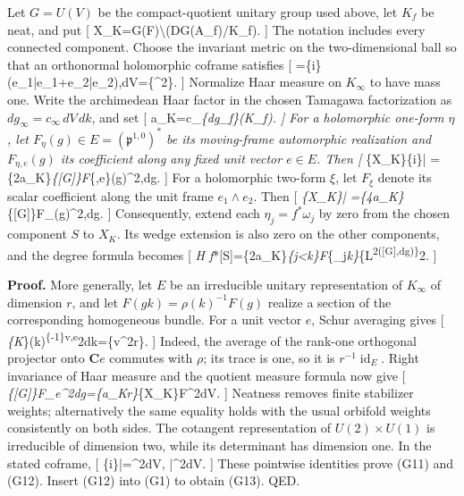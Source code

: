 \documentclass[11pt,a4paper]{article}
\theoremstyle{definition}
\begin{document}
Let \(G=U(V)\) be the compact-quotient unitary group used above, let
\(K_f\) be neat, and put {[}
X\_K=G(F)\backslash(D\times G(\mathbf A\_f)/K\_f). {]} The notation
includes every connected component. Choose the invariant metric on the
two-dimensional ball so that an orthonormal holomorphic coframe
satisfies {[}
\omega=\{i\}(e\_1\wedge\bar e\_1+e\_2\wedge\bar e\_2),\qquad dV=\{\omega\^{}2\}.
{]} Normalize Haar measure on \(K_\infty\) to have mass one. Write the
archimedean Haar factor in the chosen Tamagawa factorization as
\(dg_\infty=c_\infty\,dV\,dk\), and set {[}
a\_K=c\_\infty{}\emph{\{dg\_f\}(K\_f). {]} For a
holomorphic one-form \(\eta\), let
\(F_\eta(g)\in E=(\mathfrak p^{1,0})^*\) be its moving-frame automorphic
realization and \(F_{\eta,e}(g)\) its coefficient along any fixed unit
vector \(e\in E\). Then {[}
\int}\{X\_K\}\{i\}\eta\wedge\bar\eta\wedge\omega
=\{2\over a\_K\}\int\emph{\{{[}G{]}\}\textbar F}\{\eta,e\}(g)\textbar\^{}2,dg.
 {]} For a holomorphic two-form \(\xi\), let \(F_\xi\) denote
its scalar coefficient along the unit frame \(e_1\wedge e_2\). Then {[}
\int\emph{\{X\_K\}\xi\wedge\bar\xi
=\{4\over a\_K\}\int}\{{[}G{]}\}\textbar F\_\xi(g)\textbar\^{}2,dg.
 {]} Consequently, extend each \(\eta_j=f^*\omega_j\) by zero
from the chosen component \(S\) to \(X_K\). Its wedge extension is also
zero on the other components, and the degree formula becomes {[}
\deg\emph{H
f}*{[}S{]}=\{2\over a\_K\}\sum\emph{\{j\textless k\}\textbar F}\{\eta\_j\wedge\eta\emph{k\}\textbar{}}\{L\textsuperscript{2({[}G{]},dg)\}}2.
 {]}

\textbf{Proof.} More generally, let \(E\) be an irreducible unitary
representation of \(K_\infty\) of dimension \(r\), and let
\(F(gk)=\rho(k)^{-1}F(g)\) realize a section of the corresponding
homogeneous bundle. For a unit vector \(e\), Schur averaging gives {[}
\int\emph{\{K}\infty\}\textbar{}\langle\rho(k)\textsuperscript{\{-1\}v,e\rangle\textbar{}}2dk=\{\textbar v\textbar\^{}2\over r\}.
{]} Indeed, the average of the rank-one orthogonal projector onto
\(\mathbf Ce\) commutes with \(\rho\); its trace is one, so it is
\(r^{-1}\operatorname{id}_E\). Right invariance of Haar measure and the
quotient measure formula now give {[}
\int\emph{\{{[}G{]}\}\textbar F\_e\textbar\^{}2dg=\{a\_K\over r\}\int}\{X\_K\}\textbar F\textbar\^{}2dV.
{]} Neatness removes finite stabilizer weights; alternatively the same
equality holds with the usual orbifold weights consistently on both
sides. The cotangent representation of \(U(2)\times U(1)\) is
irreducible of dimension two, while its determinant has dimension one.
In the stated coframe, {[}
\{i\}\eta\wedge\bar\eta\wedge\omega=\textbar{}\eta\textbar\^{}2dV,
\qquad \xi\wedge\bar{}\textbar{}\xi\textbar\^{}2dV. {]} These
pointwise identities prove (G11) and (G12). Insert (G12) into (G1) to
obtain (G13). QED.
\end{document}
